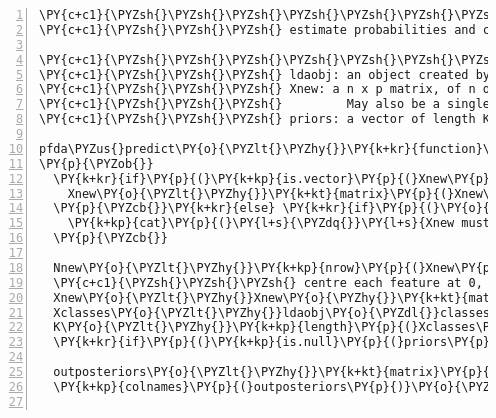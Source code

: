 \begin{Verbatim}[commandchars=\\\{\},codes={\catcode`\$=3\catcode`\^=7\catcode`\_=8},gobble=0,numbers=left,fontfamily=fvm,fontshape=n,fontsize=\footnotesize,tabsize=2]
\PY{c+c1}{\PYZsh{}\PYZsh{}\PYZsh{}\PYZsh{}\PYZsh{}\PYZsh{}\PYZsh{} FUNCTION: pfda\PYZus{}predict()}
\PY{c+c1}{\PYZsh{}\PYZsh{}\PYZsh{} estimate probabilities and class of new inputs}

\PY{c+c1}{\PYZsh{}\PYZsh{}\PYZsh{}\PYZsh{}\PYZsh{}\PYZsh{}\PYZsh{} input:}
\PY{c+c1}{\PYZsh{}\PYZsh{}\PYZsh{} ldaobj: an object created by create\PYZus{}pfda\PYZus{}obj()}
\PY{c+c1}{\PYZsh{}\PYZsh{}\PYZsh{} Xnew: a n x p matrix, of n obs and p variables. }
\PY{c+c1}{\PYZsh{}\PYZsh{}\PYZsh{}         May also be a single numeric vector (n=1) of length p}
\PY{c+c1}{\PYZsh{}\PYZsh{}\PYZsh{} priors: a vector of length K (\PYZsh{}classes) with elements in (0,1)}

pfda\PYZus{}predict\PY{o}{\PYZlt{}\PYZhy{}}\PY{k+kr}{function}\PY{p}{(}ldaobj\PY{p}{,}Xnew\PY{p}{,}priors\PY{o}{=}\PY{k+kc}{NULL}\PY{p}{)}
\PY{p}{\PYZob{}}
  \PY{k+kr}{if}\PY{p}{(}\PY{k+kp}{is.vector}\PY{p}{(}Xnew\PY{p}{,}mode\PY{o}{=}\PY{l+s}{\PYZdq{}}\PY{l+s}{numeric\PYZdq{}}\PY{p}{)}\PY{p}{)}\PY{p}{\PYZob{}}
    Xnew\PY{o}{\PYZlt{}\PYZhy{}}\PY{k+kt}{matrix}\PY{p}{(}Xnew\PY{p}{,}nrow\PY{o}{=}\PY{l+m}{1}\PY{p}{)}
  \PY{p}{\PYZcb{}}\PY{k+kr}{else} \PY{k+kr}{if}\PY{p}{(}\PY{o}{!}\PY{k+kp}{is.matrix}\PY{p}{(}Xnew\PY{p}{)}\PY{p}{)}\PY{p}{\PYZob{}}
    \PY{k+kp}{cat}\PY{p}{(}\PY{l+s}{\PYZdq{}}\PY{l+s}{Xnew must be numeric and either a vector or matrix \PYZbs{}n \PYZdq{}}\PY{p}{)}
  \PY{p}{\PYZcb{}}

  Nnew\PY{o}{\PYZlt{}\PYZhy{}}\PY{k+kp}{nrow}\PY{p}{(}Xnew\PY{p}{)}
  \PY{c+c1}{\PYZsh{}\PYZsh{}\PYZsh{} centre each feature at 0, as done on the training data}
  Xnew\PY{o}{\PYZlt{}\PYZhy{}}Xnew\PY{o}{\PYZhy{}}\PY{k+kt}{matrix}\PY{p}{(}\PY{k+kp}{rep}\PY{p}{(}ldaobj\PY{o}{\PYZdl{}}meanadj\PY{p}{,}Nnew\PY{p}{)}\PY{p}{,}nrow\PY{o}{=}Nnew\PY{p}{,}byrow\PY{o}{=}\PY{k+kc}{TRUE}\PY{p}{)}
  Xclasses\PY{o}{\PYZlt{}\PYZhy{}}ldaobj\PY{o}{\PYZdl{}}classes
  K\PY{o}{\PYZlt{}\PYZhy{}}\PY{k+kp}{length}\PY{p}{(}Xclasses\PY{p}{)}
  \PY{k+kr}{if}\PY{p}{(}\PY{k+kp}{is.null}\PY{p}{(}priors\PY{p}{)}\PY{p}{)} priors\PY{o}{\PYZlt{}\PYZhy{}}ldaobj\PY{o}{\PYZdl{}}prior
  
  outposteriors\PY{o}{\PYZlt{}\PYZhy{}}\PY{k+kt}{matrix}\PY{p}{(}\PY{l+m}{0}\PY{p}{,}nrow\PY{o}{=}Nnew\PY{p}{,}ncol\PY{o}{=}K\PY{p}{)}
  \PY{k+kp}{colnames}\PY{p}{(}outposteriors\PY{p}{)}\PY{o}{\PYZlt{}\PYZhy{}}Xclasses
  

\end{Verbatim}
